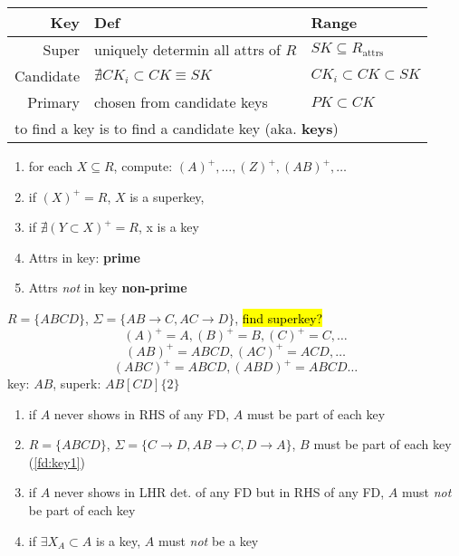 \begin{minipage}{\linewidth}
  \begin{tabular}{r|l|l}
    \hline
    Key & Def & Range\\
    \hline
    Super & uniquely determin all attrs of $R$ & $SK \subseteq R_{\text{attrs}}$ \\
    Candidate & $\nexists CK_{i} \subset CK \equiv SK $ & $CK_{i} \subset CK \subset SK$\\
    Primary & chosen from candidate keys & $PK \subset CK$\\
    \hline
    \multicolumn{3}{l}{to find a key is to find a candidate key (aka. \textbf{keys})}\\
    \hline
\end{tabular}
\end{minipage}
\begin{minipage}{0.5\linewidth}
\vspace{0.2em}
\begin{enumerate}
\item for each $X \subseteq R$, compute: $(A)^{+},\ldots,(Z)^{+},(AB)^{+},\ldots$
\item if $(X)^{+} = R$, $X$ is a superkey,
\item if $\nexists (Y\subset X)^{+} = R$, x is a key
\item Attrs in key: \textbf{prime}
\item Attrs \emph{not} in key \textbf{non-prime}
\end{enumerate}
\end{minipage}
\begin{minipage}{0.5\linewidth}
$R=\{ABCD\}$, $\Sigma=\{AB\rightarrow C, AC\rightarrow D\}$, \hl{find superkey?}
\[
(A)^{+}=A,(B)^{+}=B,(C)^{+}=C,\ldots
\]
\[
(AB)^{+}=ABCD,(AC)^{+}=ACD,\ldots
\]
\[
(ABC)^{+}=ABCD,(ABD)^{+}=ABCD\ldots
\]
key: $AB$, superk: $AB[CD]\{2\}$
\end{minipage}
\begin{minipage}{0.5\linewidth}
\begin{enumerate}
\item\label{fd:key1} if $A$ never shows in RHS of any FD, $A$ must be part of each key
\item[]$R=\{ABCD\}$, $\Sigma=\{C\rightarrow D, AB\rightarrow C, D\rightarrow A\}$, $B$ must be part of each key (\ref{fd:key1})
\item\label{fd:key2} if $A$ never shows in LHR det. of any FD but in RHS of any FD, $A$ must \emph{not} be part of each key
\item if $\exists X_{A} \subset A$ is a key, $A$ must \emph{not} be a key
\end{enumerate}
\end{minipage}
